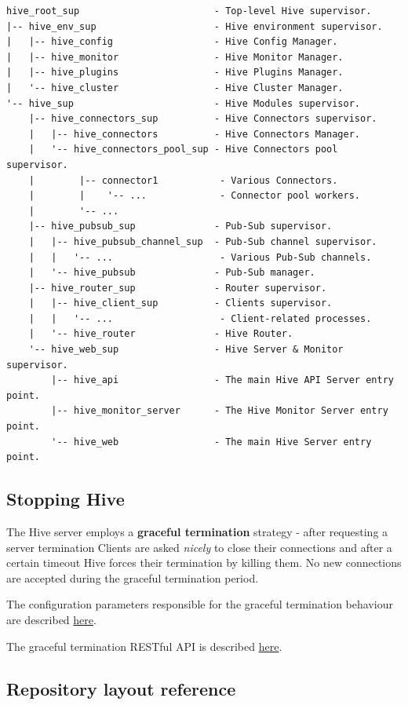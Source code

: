 \documentclass[a4paper]{article}
\begin{document}
\begin{verbatim}
hive_root_sup                        - Top-level Hive supervisor.
|-- hive_env_sup                     - Hive environment supervisor.
|   |-- hive_config                  - Hive Config Manager.
|   |-- hive_monitor                 - Hive Monitor Manager.
|   |-- hive_plugins                 - Hive Plugins Manager.
|   '-- hive_cluster                 - Hive Cluster Manager.
'-- hive_sup                         - Hive Modules supervisor.
    |-- hive_connectors_sup          - Hive Connectors supervisor.
    |   |-- hive_connectors          - Hive Connectors Manager.
    |   '-- hive_connectors_pool_sup - Hive Connectors pool supervisor.
    |        |-- connector1           - Various Connectors.
    |        |    '-- ...             - Connector pool workers.
    |        '-- ...
    |-- hive_pubsub_sup              - Pub-Sub supervisor.
    |   |-- hive_pubsub_channel_sup  - Pub-Sub channel supervisor.
    |   |   '-- ...                   - Various Pub-Sub channels.
    |   '-- hive_pubsub              - Pub-Sub manager.
    |-- hive_router_sup              - Router supervisor.
    |   |-- hive_client_sup          - Clients supervisor.
    |   |   '-- ...                   - Client-related processes.
    |   '-- hive_router              - Hive Router.
    '-- hive_web_sup                 - Hive Server & Monitor supervisor.
        |-- hive_api                 - The main Hive API Server entry point.
        |-- hive_monitor_server      - The Hive Monitor Server entry point.
        '-- hive_web                 - The main Hive Server entry point.
\end{verbatim}
\subsection{Stopping Hive}
\label{sec-2-4}

The Hive server employs a \textbf{graceful termination} strategy - after requesting a server termination Clients are asked \emph{nicely} to close their connections and after a certain timeout Hive forces their termination by killing them. No new connections are accepted during the graceful termination period.

\noindent
The configuration parameters responsible for the graceful termination behaviour are described \hyperref[ref-graceful_config]{here}.

\noindent
The graceful termination RESTful API is described \hyperref[sec-6-1-1]{here}.
\subsection{Repository layout reference}
\label{sec-2-5}
\end{document}
